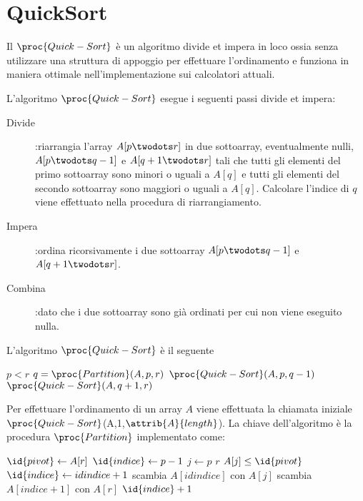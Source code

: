 \chapter{QuickSort}
Il $\proc{Quick-Sort}$ è un algoritmo divide et impera in loco ossia senza utilizzare
una struttura di appoggio per effettuare l'ordinamento e funziona in maniera ottimale
nell'implementazione sui calcolatori attuali.

L'algoritmo $\proc{Quick-Sort}$ esegue i seguenti passi divide et impera:
\begin{description}
  \item[Divide]:riarrangia l'array $A[p\twodots r]$ in due sottoarray, eventualmente nulli,
                $A[p \twodots q-1]$ e $A[q+1 \twodots r]$ tali che tutti gli elementi
                del primo sottoarray sono minori o uguali a $A[q]$ e tutti gli elementi
                del secondo sottoarray sono maggiori o uguali a $A[q]$.\newline
                Calcolare l'indice di $q$ viene effettuato nella procedura di riarrangiamento.
  \item[Impera]:ordina ricorsivamente i due sottoarray $A[p \twodots q-1]$ e $A[q+1 \twodots r]$.
  \item[Combina]:dato che i due sottoarray sono già ordinati per cui non viene eseguito nulla.
\end{description}

L'algoritmo $\proc{Quick-Sort}$ è il seguente
\begin{codebox}
\li \If $p < r$
    \Then
\li           $q = \proc{Partition}(A,p,r)$
\li           $\proc{Quick-Sort}(A,p,q-1)$
\li           $\proc{Quick-Sort}(A,q+1,r)$
    \End
\end{codebox}
Per effettuare l'ordinamento di un array $A$ viene effettuata la chiamata iniziale
$\proc{Quick-Sort}$(A,1,$\attrib{A}{length}$).\newline
La chiave dell'algoritmo è la procedura $\proc{Partition}$ implementato come:
\begin{codebox}
\li $\id{pivot} \gets A[r]$
\li $\id{indice} \gets p-1$
\li \For $j \gets p$ \To $r$
    \Do
\li               \If $A[j] \leq \id{pivot}$
                  \Then
\li                              $\id{indice} \gets id{indice} + 1$
\li                              scambia $A[id{indice}]$ con $A[j]$
                  \End
    \End
\li scambia $A[indice+1]$ con $A[r]$
\li \Return $\id{indice} + 1$
\end{codebox}

